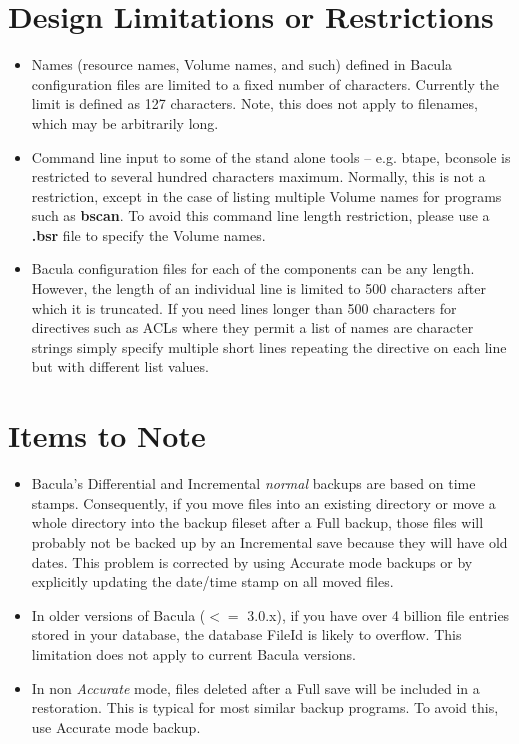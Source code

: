 \section{Design Limitations or Restrictions}

\begin{itemize}
\item Names (resource names, Volume names, and such) defined in Bacula 
   configuration files are limited to a fixed number of
   characters.  Currently the limit is defined as 127 characters.  Note,
   this does not apply to filenames, which may be arbitrarily long.
\item Command line input to some of the stand alone tools -- e.g. btape,
   bconsole is restricted to several hundred characters maximum.
   Normally, this is not a restriction, except in the case of listing
   multiple Volume names for programs such as {\bf bscan}. To avoid
   this command line length restriction, please use a {\bf .bsr} 
   file to specify the Volume names.
\item Bacula configuration files for each of the components can be
   any length. However, the length of an individual line is limited
   to 500 characters after which it is truncated.  If you need lines
   longer than 500 characters for directives such as ACLs where
   they permit a list of names are character strings simply
   specify multiple short lines repeating the directive on
   each line but with different list values.

\end{itemize}

\section{Items to Note}
\begin{itemize}
\item Bacula's Differential and Incremental \textsl{normal} backups are based
  on time stamps.  Consequently, if you move files into an existing directory
  or move a whole directory into the backup fileset after a Full backup, those
  files will probably not be backed up by an Incremental save because they will
  have old dates.  This problem is corrected by using Accurate mode backups
  or by explicitly updating the date/time stamp on all moved files.
\item In older versions of Bacula ($<=$ 3.0.x), if you have over 4 billion file
  entries stored in your database, the database FileId is likely to overflow.
  This limitation does not apply to current Bacula versions.
\item In non \textsl{Accurate} mode, files deleted after a Full save will be
  included in a restoration. This is typical for most similar backup programs.
  To avoid this, use Accurate mode backup.
\end{itemize}
